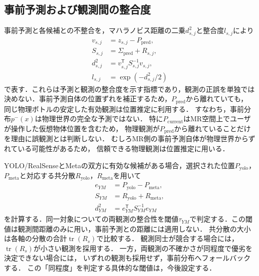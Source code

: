\documentclass{sice-si}
\newenvironment{dotsubequations}{%
  \begin{subequations}
  \renewcommand{\theequation}{\theparentequation.\arabic{equation}}%
}{\end{subequations}}
\begin{document}
\subsection{事前予測および観測間の整合度}
事前予測と各候補との不整合を，マハラノビス距離\cite{orou_mousse2023localization_uncertainty}の二乗$d^{2}_{s,j}$と整合度$l_{s,j}$により
\begin{dotsubequations}
\label{eq:prior-consistency}
\begin{align}
v_{s,j}&=z_{s,j}-P_{\mathrm{pred}},\\
S_{s,j}&=\Sigma_{\mathrm{pred}}+R_{s,j},\\
d^{2}_{s,j}&=v_{s,j}^{\mathsf T}S_{s,j}^{-1}v_{s,j},\\
l_{s,j}&=\exp(-d^{2}_{s,j}/2)
\end{align}
\end{dotsubequations}
で表す．これらは予測と観測の整合度を示す指標であり，観測の正誤を単独では決めない．事前予測自体の位置ずれを補正するため，$P_{\mathrm{pred}}$から離れていても，
同じ物理ボトルの安定した有効観測は位置推定に利用する．
すなわち，事前分布$p^{-}(x)$は物理世界の完全な予測ではない．
特に$P_{\mathrm{current}}$はMR空間上でユーザが操作した仮想物体位置を含むため，
物理観測が$P_{\mathrm{pred}}$から離れていることだけを理由に誤観測とは判断しない．
むしろMR側の事前予測自体が物理世界からずれている可能性があるため，
信頼できる物理観測は位置推定に用いる．

YOLO/RealSenseとMetaの双方に有効な候補がある場合，選択された位置$P_{\mathrm{yolo}}$，$P_{\mathrm{meta}}$と対応する共分散$R_{\mathrm{yolo}}$，$R_{\mathrm{meta}}$を用いて
\begin{dotsubequations}
\label{eq:sensor-consistency}
\begin{align}
e_{YM}&=P_{\mathrm{yolo}}-P_{\mathrm{meta}},\\
S_{YM}&=R_{\mathrm{yolo}}+R_{\mathrm{meta}},\\
d^{2}_{YM}&=e_{YM}^{\mathsf T}S_{YM}^{-1}e_{YM}
\end{align}
\end{dotsubequations}
を計算する．同一対象についての両観測の整合性を閾値$\tau_{YM}$で判定する．この閾値は観測間距離のみに用い，事前予測との距離には適用しない．
共分散の大小は各軸の分散の合計$\operatorname{tr}(R_s)$で比較する．
観測同士が競合する場合には，$\operatorname{tr}(R_s)$が小さい観測を採用する．
一方，両観測の不確かさが同程度で優劣を決定できない場合には，
いずれの観測も採用せず，事前分布へフォールバックする．
この「同程度」を判定する具体的な閾値は，今後設定する．
\end{document}
